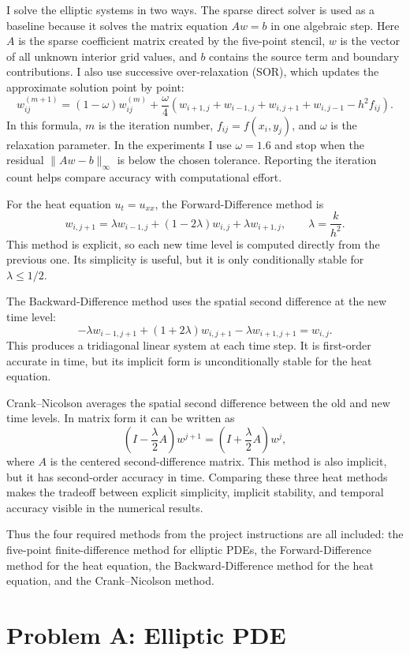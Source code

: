 \documentclass[11pt]{article}
\begin{document}
I solve the elliptic systems in two ways. The sparse direct solver is used as a
baseline because it solves the matrix equation \(Aw=b\) in one algebraic step.
Here \(A\) is the sparse coefficient matrix created by the five-point stencil,
\(w\) is the vector of all unknown interior grid values, and \(b\) contains the
source term and boundary contributions.
I also use successive over-relaxation (SOR), which updates the approximate
solution point by point:
\[
  w_{ij}^{(m+1)}
  =(1-\omega)w_{ij}^{(m)}
  +\frac{\omega}{4}
  \left(w_{i+1,j}+w_{i-1,j}+w_{i,j+1}+w_{i,j-1}-h^2 f_{ij}\right).
\]
In this formula, \(m\) is the iteration number, \(f_{ij}=f(x_i,y_j)\), and
\(\omega\) is the relaxation parameter. In the experiments I use
\(\omega=1.6\) and stop when the residual \(\|Aw-b\|_\infty\) is below the
chosen tolerance. Reporting the iteration count helps compare accuracy with
computational effort.

For the heat equation \(u_t=u_{xx}\), the Forward-Difference method is
\[
  w_{i,j+1}=\lambda w_{i-1,j}+(1-2\lambda)w_{i,j}+\lambda w_{i+1,j},
  \qquad \lambda=\frac{k}{h^2}.
\]
This method is explicit, so each new time level is computed directly from the
previous one. Its simplicity is useful, but it is only conditionally stable for
\(\lambda\leq 1/2\).

The Backward-Difference method uses the spatial second difference at the new
time level:
\[
  -\lambda w_{i-1,j+1}+(1+2\lambda)w_{i,j+1}
  -\lambda w_{i+1,j+1}=w_{i,j}.
\]
This produces a tridiagonal linear system at each time step. It is first-order
accurate in time, but its implicit form is unconditionally stable for the heat
equation.

Crank--Nicolson averages the spatial second difference between the old and new
time levels. In matrix form it can be written as
\[
  \left(I-\frac{\lambda}{2}A\right)w^{j+1}
  =
  \left(I+\frac{\lambda}{2}A\right)w^j,
\]
where \(A\) is the centered second-difference matrix. This method is also
implicit, but it has second-order accuracy in time. Comparing these three heat
methods makes the tradeoff between explicit simplicity, implicit stability, and
temporal accuracy visible in the numerical results.

Thus the four required methods from the project instructions are all included:
the five-point finite-difference method for elliptic PDEs, the
Forward-Difference method for the heat equation, the Backward-Difference method
for the heat equation, and the Crank--Nicolson method.

\section{Problem A: Elliptic PDE}
\end{document}

